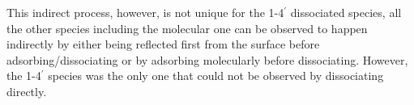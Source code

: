 \documentclass[11pt,DIV=13,BCOR=5mm,a4paper,headinclude]{scrbook}
\begin{document}
This indirect process, however, is not unique for the 1-4$^\prime$ dissociated species, all the other species including the molecular one can be observed to happen indirectly by either being reflected first from the surface before adsorbing/dissociating or by adsorbing molecularly before dissociating.
However, the 1-4$^\prime$ species was the only one that could not be observed by dissociating directly.
  \begin{figure}[h!]
  \centering
   \quad
   \quad
   \quad

\end{figure}
\end{document}
